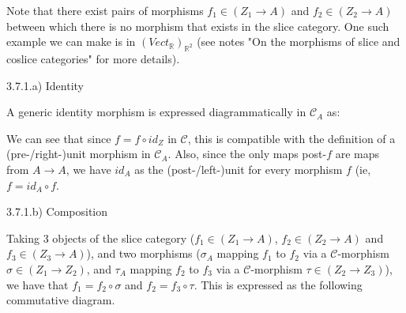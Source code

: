Note that there exist pairs of morphisms $f_1 \in (Z_1 \to A)$ and $f_2 \in (Z_2 \to A)$ between which there is no morphism that exists in the slice category. One such example we can make is in $(Vect_\mathbb{R})_{\mathbb{R}^2}$ (see notes "On the morphisms of slice and coslice categories" for more details).

3.7.1.a) Identity

A generic identity morphism is expressed diagrammatically in $\mathcal{C}_A$ as:


We can see that since $f = f \circ id_Z$ in $\mathcal{C}$, this is compatible with the definition of a (pre-/right-)unit morphism in $\mathcal{C}_A$. Also, since the only maps post-$f$ are maps from $A \to A$, we have $id_A$ as the (post-/left-)unit for every morphism $f$ (ie, $f = id_A \circ f$. 

3.7.1.b) Composition

Taking 3 objects of the slice category ($f_1 \in (Z_1 \to A)$, $f_2 \in (Z_2 \to A)$ and $f_3 \in (Z_3 \to A)$), and two morphisms ($\sigma_A$ mapping $f_1$ to $f_2$ via a $\mathcal{C}$-morphism $\sigma \in (Z_1 \to Z_2)$, and $\tau_A$ mapping $f_2$ to $f_3$ via a $\mathcal{C}$-morphism $\tau \in (Z_2 \to Z_3)$), we have that $f_1 = f_2 \circ \sigma$ and $f_2 = f_3 \circ \tau$. This is expressed as the following commutative diagram.


